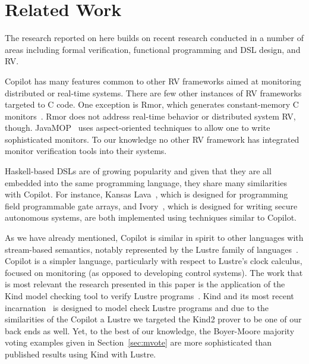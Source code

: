 \section{Related Work}\label{sec:related}
The research reported on here builds on recent  research conducted in a number
of areas including formal verification, functional programming and
DSL design, and RV. 

Copilot has many features common to other RV frameworks aimed at
 monitoring distributed or real-time systems.  
There are few other instances of RV frameworks targeted to C code.  One exception is {\sc
 Rmor}, which generates constant-memory C monitors~\cite{havelundc}.  {\sc
  Rmor} does not address real-time behavior or distributed system RV,
though.    JavaMOP~\cite{javamop}  uses aspect-oriented techniques
to allow one to write sophisticated monitors. To our knowledge no
other RV framework has integrated monitor verification tools into
their systems. 


Haskell-based DSLs are of growing popularity and given that they are all
embedded into the same programming language, they share many
similarities with Copilot. For instance, 
 Kansas Lava~\cite{Gill:14:DSLs}, which is designed for
programming  field programmable gate arrays,  and 
Ivory~\cite{pike-plpv14}, which is designed for writing secure autonomous
systems, are both implemented using techniques similar to Copilot.  




As we have already mentioned, Copilot is similar in spirit to other
languages with stream-based semantics, notably represented by the
Lustre family of languages~\cite{lustre-intro}.  Copilot is a simpler
language, particularly with respect to Lustre's clock calculus,
focused on monitoring (as opposed to developing control systems).
The work that is most
relevant the research presented in this paper is the application of
the Kind model checking tool to verify Lustre programs~\cite{Hagen08}.
Kind and its most recent incarnation~\cite{kind} is designed to model
check Lustre programs and due to the similarities of the Copilot a
Lustre we targeted the Kind2 prover to be one of our back ends as
well.  Yet, to the best of our knowledge, the Boyer-Moore majority
voting examples given in Section~\ref{sec:mvote} are more
sophisticated than published results using Kind with Lustre.
  


